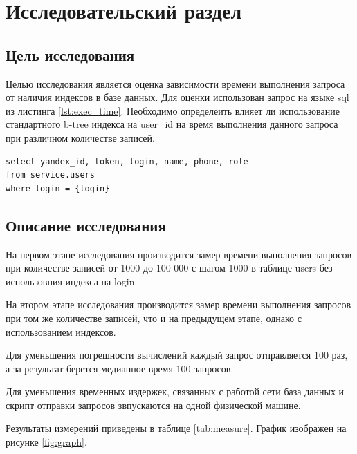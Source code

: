 \section{Исследовательский раздел} \label{research}

\subsection{Цель исследования}

Целью исследования является оценка зависимости времени выполнения запроса от наличия индексов в базе данных. Для оценки использован запрос на языке sql\cite{sql} из листинга \ref{lst:exec_time}. Необходимо определеить влияет ли использование стандартного b-tree индекса на user{\_}id  на время выполнения данного запроса при различном количестве записей.

\begin{lstlisting}[label=lst:exec_time, caption=Запрос для исследования]
select yandex_id, token, login, name, phone, role
from service.users
where login = {login}
\end{lstlisting}

\subsection{Описание исследования}

На первом этапе исследования производится замер времени выполнения запросов при количестве записей от 1000 до 100 000 с шагом 1000 в таблице users без использовния индекса на login.

На втором этапе исследования производится замер времени выполнения запросов при том же количестве записей, что и на предыдущем этапе, однако с использованием индексов.

Для уменьшения погрешности вычислений каждый запрос отправляется 100 раз, а за результат берется медианное время 100 запросов.

Для уменьшения временных издержек, связанных с работой сети база данных и скрипт отправки запросов звпускаются на одной физической машине.

Результаты измерений приведены в таблице \ref{tab:measure}. График изображен на рисунке \ref{fig:graph}.

\pagebreak

